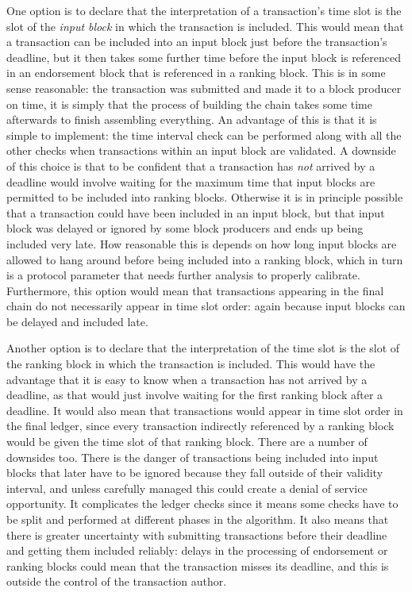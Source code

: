 \documentclass[11pt,a4paper]{article}
\begin{document}
One option is to declare that the interpretation of a transaction's time slot
is the slot of the \emph{input block} in which the transaction is included.
This would mean that a transaction can be included into an input block just
before the transaction's deadline, but it then takes some further time before
the input block is referenced in an endorsement block that is referenced in a
ranking block. This is in some sense reasonable: the transaction was submitted
and made it to a block producer on time, it is simply that the process of
building the chain takes some time afterwards to finish assembling everything.
An advantage of this is that it is simple to implement: the time interval check
can be performed along with all the other checks when transactions within an
input block are validated. A downside of this choice is that to be confident
that a transaction has \emph{not} arrived by a deadline would involve waiting
for the maximum time that input blocks are permitted to be included into
ranking blocks. Otherwise it is in principle possible that a transaction could
have been included in an input block, but that input block was delayed or
ignored by some block producers and ends up being included very late. How
reasonable this is depends on how long input blocks are allowed to hang around
before being included into a ranking block, which in turn is a protocol
parameter that needs further analysis to properly calibrate. Furthermore, this
option would mean that transactions appearing in the final chain do not
necessarily appear in time slot order: again because input blocks can be
delayed and included late.

Another option is to declare that the interpretation of the time slot is the
slot of the ranking block in which the transaction is included. This would have
the advantage that it is easy to know when a transaction has not arrived by a
deadline, as that would just involve waiting for the first ranking block after
a deadline. It would also mean that transactions would appear in time slot
order in the final ledger, since every transaction indirectly referenced by a
ranking block would be given the time slot of that ranking block. There are a
number of downsides too. There is the danger of transactions being included
into input blocks that later have to be ignored because they fall outside of
their validity interval, and unless carefully managed this could create a
denial of service opportunity. It complicates the ledger checks since it means
some checks have to be split and performed at different phases in the algorithm.
It also means that there is greater uncertainty with submitting transactions
before their deadline and getting them included reliably: delays in the
processing of endorsement or ranking blocks could mean that the transaction
misses its deadline, and this is outside the control of the transaction author.
\end{document}
